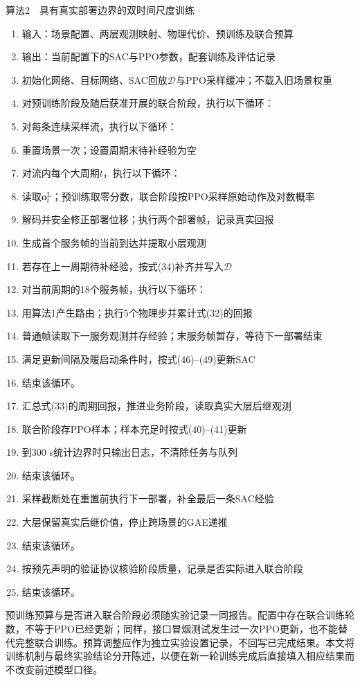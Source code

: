 \par 算法2　具有真实部署边界的双时间尺度训练\par
\begin{enumerate}
\item 输入：场景配置、两层观测映射、物理代价、预训练及联合预算
\item 输出：当前配置下的SAC与PPO参数，配套训练及评估记录
\item 初始化网络、目标网络、SAC回放$\mathcal D$与PPO采样缓冲；不载入旧场景权重
\item 对预训练阶段及随后获准开展的联合阶段，执行以下循环：
\item 对每条连续采样流，执行以下循环：
\item 重置场景一次；设置周期末待补经验为空
\item 对流内每个大周期$t$，执行以下循环：
\item 读取$\boldsymbol o_t^{\mathrm L}$；预训练取零分数，联合阶段按PPO采样原始动作及对数概率
\item 解码并安全修正部署位移；执行两个部署帧，记录真实回报
\item 生成首个服务帧的当前到达并提取小层观测
\item 若存在上一周期待补经验，按式(34)补齐并写入$\mathcal D$
\item 对当前周期的18个服务帧，执行以下循环：
\item 用算法1产生路由；执行5个物理步并累计式(32)的回报
\item 普通帧读取下一服务观测并存经验；末服务帧暂存，等待下一部署结束
\item 满足更新间隔及暖启动条件时，按式(46)--(49)更新SAC
\item 结束该循环。
\item 汇总式(33)的周期回报，推进业务阶段，读取真实大层后继观测
\item 联合阶段存PPO样本；样本充足时按式(40)--(41)更新
\item 到300 s统计边界时只输出日志，不清除任务与队列
\item 结束该循环。
\item 采样截断处在重置前执行下一部署，补全最后一条SAC经验
\item 大层保留真实后继价值，停止跨场景的GAE递推
\item 结束该循环。
\item 按预先声明的验证协议核验阶段质量，记录是否实际进入联合阶段
\item 结束该循环。
\end{enumerate}

预训练预算与是否进入联合阶段必须随实验记录一同报告。配置中存在联合训练轮数，不等于PPO已经更新；同样，接口冒烟测试发生过一次PPO更新，也不能替代完整联合训练。预算调整应作为独立实验设置记录，不回写已完成结果。本文将训练机制与最终实验结论分开陈述，以便在新一轮训练完成后直接填入相应结果而不改变前述模型口径。

